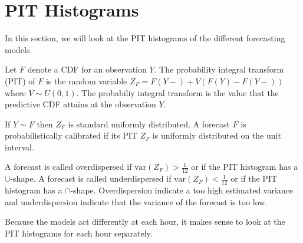 \section{PIT Histograms}


In this section, we will look at the PIT histograms of the different forecasting models. 

Let \(F\) denote a CDF for an observation \(Y\). The probability integral 
transform (PIT) of \(F\) is the random variable \(Z_F = F(Y-) + V(F(Y) - F(Y-))\) 
where \(V \sim U(0,1)\). 
The probabiliy integral transform is the value that the predictive CDF 
attains at the observation \(Y\). 

If \(Y \sim F\) then \(Z_F\) is standard uniformly distributed. 
A forecast \(F\) is probabilistically calibrated if its PIT \(Z_F\) 
is uniformly distributed on the unit interval. 

A forecast is called overdispersed if \(\mathrm{var}(Z_F) > \frac{1}{12}\) or if 
the PIT histogram has a \(\cup\)-shape. A forecast is called underdispersed if 
\(\mathrm{var}(Z_F) < \frac{1}{12}\) or if the PIT histogram has a \(\cap\)-shape. 
Overdispersion indicate a too high estimated variance and underdispersion indicate 
that the variance of the forecast is too low. 

Because the models act differently at each hour, it makes sense 
to look at the PIT histograms for each hour separately. 


